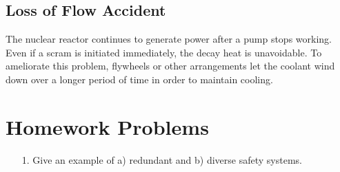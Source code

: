 \subsection{Loss of Flow Accident}
The nuclear reactor continues to generate power after a pump stops working. Even if a scram is initiated immediately, the decay heat is unavoidable.
To ameliorate this problem, flywheels or other arrangements let the coolant wind down over a longer period of time in order to maintain cooling.

\section{Homework Problems}
\begin{itemize}
  \item[1.] Give an example of a) redundant and b) diverse safety systems.
\end{itemize}